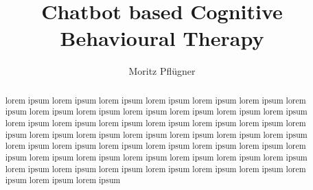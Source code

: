 \documentclass[sigconf, nonacm]{acmart}
\begin{document}
\graphicspath{ {./images/} }

\title{Chatbot based Cognitive Behavioural Therapy}

\author{Moritz Pflügner}


\begin{abstract}
  lorem ipsum lorem ipsum lorem ipsum lorem ipsum lorem ipsum lorem ipsum 
  lorem ipsum lorem ipsum lorem ipsum lorem ipsum lorem ipsum lorem ipsum 
  lorem ipsum lorem ipsum lorem ipsum lorem ipsum lorem ipsum lorem ipsum 
  lorem ipsum lorem ipsum lorem ipsum lorem ipsum lorem ipsum lorem ipsum 
  lorem ipsum lorem ipsum lorem ipsum lorem ipsum lorem ipsum lorem ipsum 
  lorem ipsum lorem ipsum lorem ipsum lorem ipsum lorem ipsum lorem ipsum 
  lorem ipsum lorem ipsum lorem ipsum lorem ipsum lorem ipsum lorem ipsum
  lorem ipsum lorem ipsum lorem ipsum lorem ipsum lorem ipsum lorem ipsum 
\end{abstract}

\keywords{}

\maketitle
\end{document}
